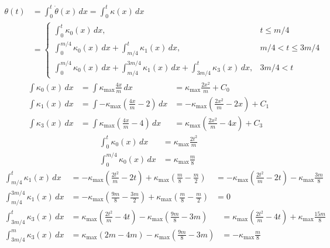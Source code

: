 \documentclass{article}
\begin{document}
\begin{align}
  \theta\left(t\right) &= \int_0^t \dot{\theta}\left(x\right)\,dx = \int_0^t \kappa\left(x\right)\,dx\\
  &= \left\{
    \begin{array}{cc}
      \int_0^t \kappa_{0}\left(x\right)\,dx,   & t \le m/4\\
      \int_0^{m/4} \kappa_{0}\left(x\right)\,dx + \int_{m/4}^t     \kappa_{1}\left(x\right)\,dx,   & m/4 < t \le 3m/4\\
      \int_0^{m/4} \kappa_{0}\left(x\right)\,dx + \int_{m/4}^{3m/4} \kappa_{1}\left(x\right)\,dx + \int_{3m/4}^t \kappa_{3}\left(x\right)\,dx, & 3m/4 < t
    \end{array}
  \right.
\end{align}
\begin{align}
  \int \kappa_{0}\left(x\right)\,dx &= \int \kappa_{\max}\frac{4x}{m}\,dx &= \kappa_{\max}\frac{2x^{2}}{m} + C_{0}\\
  \int \kappa_{1}\left(x\right)\,dx &= \int -\kappa_{\max}\left(\frac{4x}{m}-2\right)\,dx &= -\kappa_{\max}\left(\frac{2x^{2}}{m}-2x\right) + C_{1}\\
  \int \kappa_{3}\left(x\right)\,dx &= \int \kappa_{\max}\left(\frac{4x}{m}-4\right)\,dx &= \kappa_{\max}\left(\frac{2x^{2}}{m}-4x\right) + C_{3}
\end{align}
\begin{align}
  \int_{0}^{t} \kappa_{0}\left(x\right)\,dx &= \kappa_{\max}\frac{2t^{2}}{m}\\
  \int_{0}^{m/4} \kappa_{0}\left(x\right)\,dx &= \kappa_{\max}\frac{m}{8}
\end{align}
\begin{align}
  \int_{m/4}^{t} \kappa_{1}\left(x\right)\,dx &= -\kappa_{\max}\left(\frac{2t^{2}}{m}-2t\right) + \kappa_{\max}\left(\frac{m}{8}-\frac{m}{2}\right) &= -\kappa_{\max}\left(\frac{2t^{2}}{m}-2t\right) - \kappa_{\max}\frac{3m}{8}\\
  \int_{m/4}^{3m/4} \kappa_{1}\left(x\right)\,dx &= -\kappa_{\max}\left(\frac{9m}{8}-\frac{3m}{2}\right) + \kappa_{\max}\left(\frac{m}{8}-\frac{m}{2}\right) &= 0
\end{align}
\begin{align}
  \int_{3m/4}^{t} \kappa_{3}\left(x\right)\,dx &= \kappa_{\max}\left(\frac{2t^{2}}{m}-4t\right) - \kappa_{\max}\left(\frac{9m}{8}-3m\right) &= \kappa_{\max}\left(\frac{2t^{2}}{m}-4t\right) + \kappa_{\max}\frac{15m}{8}\\
  \int_{3m/4}^{m} \kappa_{3}\left(x\right)\,dx &= \kappa_{\max}\left(2m-4m\right) - \kappa_{\max}\left(\frac{9m}{8}-3m\right) &= -\kappa_{\max}\frac{m}{8}
\end{align}
\end{document}
